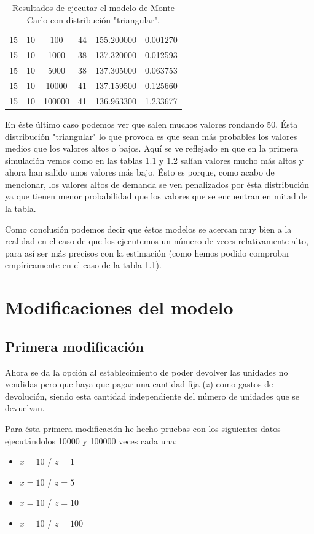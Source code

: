\documentclass[11pt,a4paper]{report}
\begin{document}
\begin{table}[H]
{\begin{tabular}{|c|c|c|c|c|c|}
        15 & 10 & 100 & 44 & 155.200000 & 0.001270 \\ 
        15 & 10 & 1000 & 38 & 137.320000 & 0.012593 \\ 
        15 & 10 & 5000 & 38 & 137.305000 & 0.063753 \\ 
        15 & 10 & 10000 & 41 & 137.159500 & 0.125660 \\ 
        15 & 10 & 100000 & 41 & 136.963300 & 1.233677 \\ \hline
\end{tabular}
}%
\caption{Resultados de ejecutar el modelo de Monte Carlo con distribución "triangular".}
\label{tabla3}
\end{table}

En éste último caso podemos ver que salen muchos valores rondando 50. Ésta distribución "triangular" lo que provoca es que sean más probables los valores medios que los valores altos o bajos. Aquí se ve reflejado en que en la primera simulación vemos como en las tablas 1.1 y 1.2 salían valores mucho más altos y ahora han salido unos valores más bajo. Ésto es porque, como acabo de mencionar, los valores altos de demanda se ven penalizados por ésta distribución ya que tienen menor probabilidad que los valores que se encuentran en mitad de la tabla.

Como conclusión podemos decir que éstos modelos se acercan muy bien a la realidad en el caso de que los ejecutemos un número de veces relativamente alto, para así ser más precisos con la estimación (como hemos podido comprobar empíricamente en el caso de la tabla 1.1).

\newpage

\section{Modificaciones del modelo}
\subsection{Primera modificación}

Ahora se da la opción al establecimiento de poder devolver las unidades no vendidas pero que haya que pagar una cantidad fija ($z$) como gastos de devolución, siendo esta cantidad independiente del número de unidades que se devuelvan.

Para ésta primera modificación he hecho pruebas con los siguientes datos ejecutándolos 10000 y 100000 veces cada una:

\begin{itemize}
	\item{$x = 10$ / $z = 1$}
	\item{$x = 10$ / $z = 5$}
	\item{$x = 10$ / $z = 10$}
	\item{$x = 10$ / $z = 100$}
\end{itemize}
\end{document}
